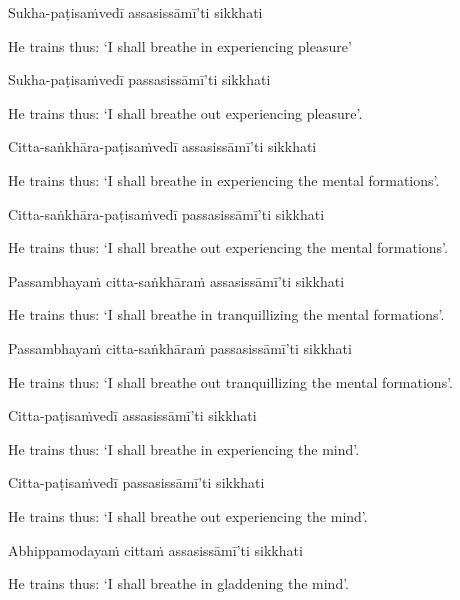 Sukha-paṭisaṁvedī assasissāmī'ti sikkhati

\begin{english}
  He trains thus: `I shall breathe in experiencing pleasure'
\end{english}

Sukha-paṭisaṁvedī passasissāmī'ti sikkhati

\begin{english}
  He trains thus: `I shall breathe out experiencing pleasure'.
\end{english}

Citta-saṅkhāra-paṭisaṁvedī assasissāmī'ti sikkhati

\begin{english}
  He trains thus: `I shall breathe in experiencing the mental formations'.
\end{english}

Citta-saṅkhāra-paṭisaṁvedī passasissāmī'ti sikkhati

\begin{english}
  He trains thus: `I shall breathe out experiencing the mental formations'.
\end{english}

Passambhayaṁ citta-saṅkhāraṁ assasissāmī'ti sikkhati

\begin{english}
  He trains thus: `I shall breathe in tranquillizing the mental formations'.
\end{english}

Passambhayaṁ citta-saṅkhāraṁ passasissāmī'ti sikkhati

\begin{english}
  He trains thus: `I shall breathe out tranquillizing the mental formations'.
\end{english}

Citta-paṭisaṁvedī assasissāmī'ti sikkhati

\begin{english}
  He trains thus: `I shall breathe in experiencing the mind'.
\end{english}

Citta-paṭisaṁvedī passasissāmī'ti sikkhati

\begin{english}
  He trains thus: `I shall breathe out experiencing the mind'.
\end{english}

Abhippamodayaṁ cittaṁ assasissāmī'ti sikkhati

\begin{english}
  He trains thus: `I shall breathe in gladdening the mind'.
\end{english}

